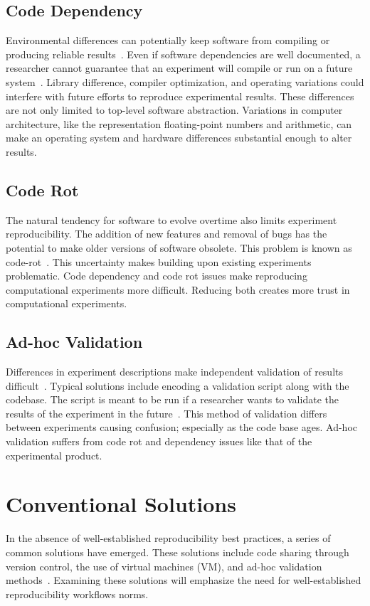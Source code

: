 \documentclass{IEEEtran}
\begin{document}
\subsection{Code Dependency}
Environmental differences can potentially keep software from compiling or producing reliable results~\cite{ITD}. Even if software dependencies are well documented, a researcher cannot guarantee that an experiment will compile or run on a future system~\cite{TESP}. Library difference, compiler optimization, and operating variations could interfere with future efforts to reproduce experimental results. These differences are not only limited to top-level software abstraction. Variations in computer architecture, like the representation floating-point numbers and arithmetic, can make an operating system and hardware differences substantial enough to alter results. 

\subsection{Code Rot}
The natural tendency for software to evolve overtime also limits experiment reproducibility. The addition of new features and removal of bugs has the potential to make older versions of software obsolete. This problem is known as code-rot~\cite{ITD}. This uncertainty makes building upon existing experiments problematic. Code dependency and code rot issues make reproducing computational experiments more difficult. Reducing both creates more trust in computational experiments.

\subsection{Ad-hoc Validation}
Differences in experiment descriptions make independent validation of results difficult~\cite{TPC}. Typical solutions include encoding a validation script along with the codebase. The script is meant to be run if a researcher wants to validate the results of the experiment in the future~\cite{TPC}. This method of validation differs between experiments causing confusion; especially as the code base ages. Ad-hoc validation suffers from code rot and dependency issues like that of the experimental product.

\section{Conventional Solutions}
In the absence of well-established reproducibility best practices, a series of common solutions have emerged. These solutions include code sharing through version control, the use of virtual machines (VM), and ad-hoc validation methods~\cite{TPC}. Examining these solutions will emphasize the need for well-established reproducibility workflows norms.
\end{document}

